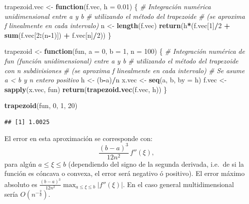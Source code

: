 \documentclass[]{book}
\newenvironment{Shaded}{\begin{snugshade}}{\end{snugshade}}
\newcommand{\KeywordTok}[1]{\textcolor[rgb]{0.13,0.29,0.53}{\textbf{#1}}}
\newcommand{\DataTypeTok}[1]{\textcolor[rgb]{0.13,0.29,0.53}{#1}}
\newcommand{\DecValTok}[1]{\textcolor[rgb]{0.00,0.00,0.81}{#1}}
\newcommand{\FloatTok}[1]{\textcolor[rgb]{0.00,0.00,0.81}{#1}}
\newcommand{\StringTok}[1]{\textcolor[rgb]{0.31,0.60,0.02}{#1}}
\newcommand{\CommentTok}[1]{\textcolor[rgb]{0.56,0.35,0.01}{\textit{#1}}}
\newcommand{\ControlFlowTok}[1]{\textcolor[rgb]{0.13,0.29,0.53}{\textbf{#1}}}
\newcommand{\OperatorTok}[1]{\textcolor[rgb]{0.81,0.36,0.00}{\textbf{#1}}}
\newcommand{\NormalTok}[1]{#1}
\theoremstyle{definition}
\theoremstyle{definition}
\theoremstyle{definition}
\theoremstyle{remark}
\begin{document}
\begin{Shaded}
\begin{Highlighting}[]
\NormalTok{trapezoid.vec <-}\StringTok{ }\ControlFlowTok{function}\NormalTok{(f.vec, }\DataTypeTok{h =} \FloatTok{0.01}\NormalTok{) \{}
\CommentTok{# Integración numérica unidimensional entre a y b}
\CommentTok{# utilizando el método del trapezoide }
\CommentTok{# (se aproxima f linealmente en cada intervalo)}
\NormalTok{  n <-}\StringTok{ }\KeywordTok{length}\NormalTok{(f.vec) }
  \KeywordTok{return}\NormalTok{(h}\OperatorTok{*}\NormalTok{(f.vec[}\DecValTok{1}\NormalTok{]}\OperatorTok{/}\DecValTok{2} \OperatorTok{+}\StringTok{ }\KeywordTok{sum}\NormalTok{(f.vec[}\DecValTok{2}\OperatorTok{:}\NormalTok{(n}\OperatorTok{-}\DecValTok{1}\NormalTok{)]) }\OperatorTok{+}\StringTok{ }\NormalTok{f.vec[n]}\OperatorTok{/}\DecValTok{2}\NormalTok{))}
\NormalTok{\}}

\NormalTok{trapezoid <-}\StringTok{ }\ControlFlowTok{function}\NormalTok{(fun, }\DataTypeTok{a =} \DecValTok{0}\NormalTok{, }\DataTypeTok{b =} \DecValTok{1}\NormalTok{, }\DataTypeTok{n =} \DecValTok{100}\NormalTok{) \{}
\CommentTok{# Integración numérica de fun (función unidimensional) entre a y b}
\CommentTok{# utilizando el método del trapezoide con n subdivisiones}
\CommentTok{# (se aproxima f linealmente en cada intervalo)}
\CommentTok{# Se asume a < b y n entero positivo }
\NormalTok{  h <-}\StringTok{ }\NormalTok{(b}\OperatorTok{-}\NormalTok{a)}\OperatorTok{/}\NormalTok{n}
\NormalTok{  x.vec <-}\StringTok{ }\KeywordTok{seq}\NormalTok{(a, b, }\DataTypeTok{by =}\NormalTok{ h)}
\NormalTok{  f.vec <-}\StringTok{ }\KeywordTok{sapply}\NormalTok{(x.vec, fun)}
  \KeywordTok{return}\NormalTok{(}\KeywordTok{trapezoid.vec}\NormalTok{(f.vec, h))}
\NormalTok{\}}

\KeywordTok{trapezoid}\NormalTok{(fun, }\DecValTok{0}\NormalTok{, }\DecValTok{1}\NormalTok{, }\DecValTok{20}\NormalTok{)}
\end{Highlighting}
\end{Shaded}

\begin{verbatim}
## [1] 1.0025
\end{verbatim}

El error en esta aproximación se corresponde con:
\[ \frac{(b-a)^3}{12n^2}\,f''(\xi), \] para algún \(a\leq \xi \leq b\)
(dependiendo del signo de la segunda derivada, i.e.~de si la función es
cóncava o convexa, el error será negativo ó positivo). El error máximo
absoluto es
\(\frac{(b-a)^3}{12n^2}\max_{a\leq \xi \leq b}\left|f''(\xi)\right|\).
En el caso general multidimensional sería \(O(n^{-\frac{2}{d}})\).
\end{document}
